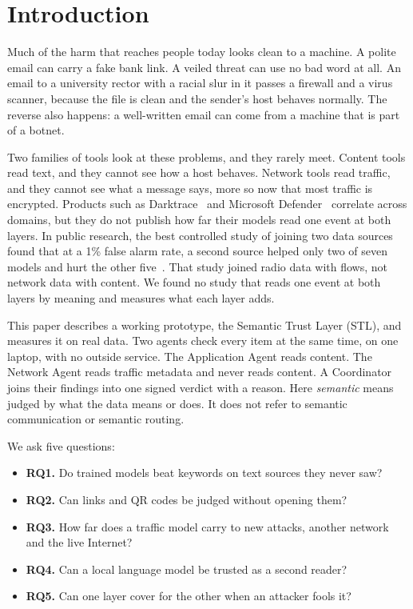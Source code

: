 \section{Introduction}

Much of the harm that reaches people today looks clean to a machine. A polite email can carry a fake bank link. A veiled threat can use no bad word at all. An email to a university rector with a racial slur in it passes a firewall and a virus scanner, because the file is clean and the sender's host behaves normally. The reverse also happens: a well-written email can come from a machine that is part of a botnet.

Two families of tools look at these problems, and they rarely meet. Content tools read text, and they cannot see how a host behaves. Network tools read traffic, and they cannot see what a message says, more so now that most traffic is encrypted. Products such as Darktrace~\cite{darktrace} and Microsoft Defender~\cite{triage} correlate across domains, but they do not publish how far their models read one event at both layers. In public research, the best controlled study of joining two data sources found that at a 1\% false alarm rate, a second source helped only two of seven models and hurt the other five~\cite{fard}. That study joined radio data with flows, not network data with content. We found no study that reads one event at both layers by meaning and measures what each layer adds.

This paper describes a working prototype, the Semantic Trust Layer (STL), and measures it on real data. Two agents check every item at the same time, on one laptop, with no outside service. The Application Agent reads content. The Network Agent reads traffic metadata and never reads content. A Coordinator joins their findings into one signed verdict with a reason. Here \emph{semantic} means judged by what the data means or does. It does not refer to semantic communication or semantic routing.

We ask five questions:

\begin{itemize}
  \item \textbf{RQ1.} Do trained models beat keywords on text sources they never saw?
  \item \textbf{RQ2.} Can links and QR codes be judged without opening them?
  \item \textbf{RQ3.} How far does a traffic model carry to new attacks, another network and the live Internet?
  \item \textbf{RQ4.} Can a local language model be trusted as a second reader?
  \item \textbf{RQ5.} Can one layer cover for the other when an attacker fools it?
\end{itemize}

